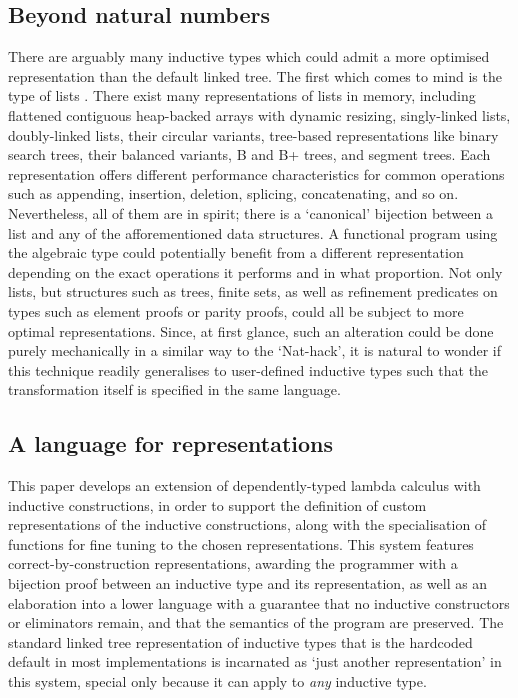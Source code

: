 \subsection{Beyond natural numbers}

There are arguably many inductive types which could admit a more optimised
representation than the default linked tree. The first which comes to mind is
the type of lists . There exist many
representations of lists in memory, including flattened contiguous heap-backed
arrays with dynamic resizing, singly-linked lists, doubly-linked lists, their
circular variants, tree-based representations like binary search trees, their
balanced variants, B and B+ trees, and segment trees. Each representation
offers different performance characteristics for common operations such as
appending, insertion, deletion, splicing, concatenating, and so on.
Nevertheless, all of them are  in spirit; there is a `canonical'
bijection between a list and any of the afforementioned data structures. A
functional program using the algebraic  type could potentially
benefit from a different representation depending on the exact operations it
performs and in what proportion. Not only lists, but structures such as trees,
finite sets, as well as refinement predicates on types such as element proofs
or parity proofs, could all be subject to more optimal representations. Since,
at first glance, such an alteration could be done purely mechanically in a
similar way to the `Nat-hack', it is natural to wonder if this technique
readily generalises to user-defined inductive types such that the
transformation itself is specified in the same language.

\subsection{A language for representations}

This paper develops an extension of dependently-typed lambda calculus with
inductive constructions, in order to support the definition of custom
representations of the inductive constructions, along with the specialisation
of functions for fine tuning to the chosen representations. This system
features correct-by-construction representations, awarding the programmer with
a bijection proof between an inductive type and its representation, as well as
an elaboration into a lower language with a guarantee that no inductive
constructors or eliminators remain, and that the semantics of the program are
preserved. The standard linked tree representation of inductive types that is
the hardcoded default in most implementations is incarnated as `just another
representation' in this system, special only because it can apply to \emph{any}
inductive type.

